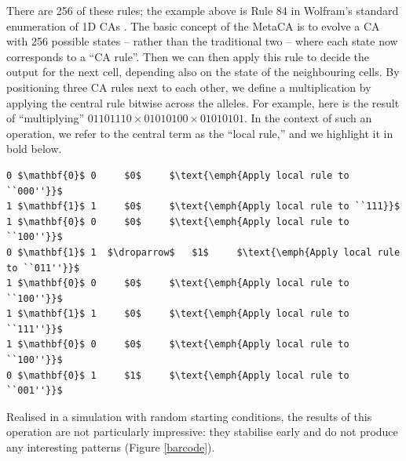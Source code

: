 \documentclass{AISB2008}
\newcommand{\droparrow}{%
  \mathchoice{\raisebox{-4pt}{$\displaystyle\mapsto$}}
             {\raisebox{-4pt}{$\mapsto$}}
             {\raisebox{-2pt}{$\scriptstyle\mapsto$}}
             {\raisebox{-2pt}{$\scriptscriptstyle\mapsto$}}}
\begin{document}
There are 256 of these rules; the example above is Rule 84 in
Wolfram's standard enumeration of 1D CAs \cite{wolfram1994cellular}.
The basic concept of the MetaCA is to evolve a CA with 256 possible
states -- rather than the traditional two -- where each state now
corresponds to a ``CA rule''.  Then we can then apply this rule to
decide the output for the next cell, depending also on the state of
the neighbouring cells.  By positioning three CA rules next to each
other, we define a multiplication by applying the central rule bitwise
across the alleles.
%
For example, here is the result of ``multiplying'' $01101110\times
01010100\times 01010101$.  In the context of such an operation, we
refer to the central term as the ``local rule,'' and we highlight it
in bold below.

\lstset{
  xleftmargin=.1\columnwidth, xrightmargin=.01\columnwidth
}

\begin{lstlisting}[mathescape]
0 $\mathbf{0}$ 0     $0$     $\text{\emph{Apply local rule to ``000''}}$
1 $\mathbf{1}$ 1     $0$     $\text{\emph{Apply local rule to ``111}}$
1 $\mathbf{0}$ 0     $0$     $\text{\emph{Apply local rule to ``100''}}$
0 $\mathbf{1}$ 1  $\droparrow$   $1$     $\text{\emph{Apply local rule to ``011''}}$
1 $\mathbf{0}$ 0     $0$     $\text{\emph{Apply local rule to ``100''}}$
1 $\mathbf{1}$ 1     $0$     $\text{\emph{Apply local rule to ``111''}}$
1 $\mathbf{0}$ 0     $0$     $\text{\emph{Apply local rule to ``100''}}$
0 $\mathbf{0}$ 1     $1$     $\text{\emph{Apply local rule to ``001''}}$
\end{lstlisting}

Realised in a simulation with random starting conditions, the results
of this operation are not particularly impressive: they stabilise
early and do not produce any interesting patterns (Figure
\ref{barcode}).
\end{document}
